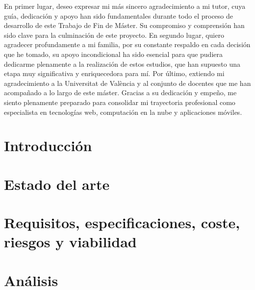 \documentclass[twoside,spanish,a4paper,12pt]{tfg}
\begin{document}
\begin{agradecimientos}
  En primer lugar, deseo expresar mi más sincero agradecimiento a mi tutor, cuya guía, dedicación y apoyo han sido fundamentales durante todo el proceso de desarrollo de este Trabajo de Fin de Máster. Su compromiso y comprensión han sido clave para la culminación de este proyecto.
  En segundo lugar, quiero agradecer profundamente a mi familia, por su constante respaldo en cada decisión que he tomado, su apoyo incondicional ha sido esencial para que pudiera dedicarme plenamente a la realización de estos estudios, que han supuesto una etapa muy significativa y enriquecedora para mí.
  Por último, extiendo mi agradecimiento a la Universitat de València y al conjunto de docentes que me han acompañado a lo largo de este máster. Gracias a su dedicación y empeño, me siento plenamente preparado para consolidar mi trayectoria profesional como especialista en tecnologías web, computación en la nube y aplicaciones móviles.
\end{agradecimientos}
\cleardoublepage



\tableofcontents
\cleardoublepage
\listoffigures
\cleardoublepage
\listoftables
\cleardoublepage
\lstlistoflistings


\pagestyle{tfg}
\justify



\chapter{Introducción}


\chapter{Estado del arte}\label{ch:estado-arte}


\chapter{Requisitos, especificaciones, coste, riesgos y viabilidad}\label{ch:requisitos}


\chapter{Análisis}\label{ch:analisis}

\end{document}
